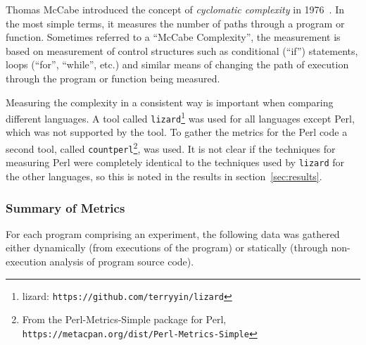 Thomas McCabe introduced the concept of \textit{cyclomatic complexity} in 1976~\cite{mccabe.1976}. In the most simple terms, it measures the number of paths through a program or function. Sometimes referred to a ``McCabe Complexity'', the measurement is based on measurement of control structures such as conditional (``if'') statements, loops (``for'', ``while'', etc.) and similar means of changing the path of execution through the program or function being measured.

Measuring the complexity in a consistent way is important when comparing different languages. A tool called \texttt{lizard}\footnote{lizard: \texttt{https://github.com/terryyin/lizard}} was used for all languages except Perl, which was not supported by the tool. To gather the metrics for the Perl code a second tool, called \texttt{countperl}\footnote{From the Perl-Metrics-Simple package for Perl, \texttt{https://metacpan.org/dist/Perl-Metrics-Simple}}, was used. It is not clear if the techniques for measuring Perl were completely identical to the techniques used by \texttt{lizard} for the other languages, so this is noted in the results in section~\ref{sec:results}.

\subsubsection{Summary of Metrics}

For each program comprising an experiment, the following data was gathered either dynamically (from executions of the program) or statically (through non-execution analysis of program source code).

